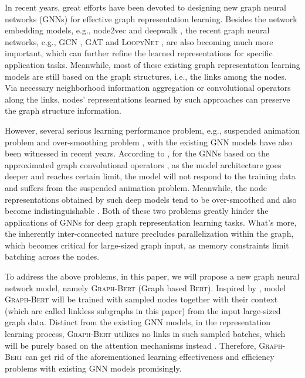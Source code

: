 \documentclass{article}
\newcommand{\our}{\textsc{Graph-Bert}}
\newcommand{\bert}{\textsc{Bert}}
\newcommand{\gcn}{\textsc{GCN}}
\newcommand{\gat}{\textsc{GAT}}
\newcommand{\loopy}{\textsc{LoopyNet}}
\begin{document}
In recent years, great efforts have been devoted to designing new graph neural networks (GNNs) for effective graph representation learning. Besides the network embedding models, e.g., node2vec \cite{DBLP:journals/corr/GroverL16} and deepwalk \cite{Perozzi:2014:DOL:2623330.2623732}, the recent graph neural networks, e.g., {\gcn} \cite{Kipf_Semi_CORR_16}, {\gat} \cite{Velickovic_Graph_ICLR_18} and {\loopy} \cite{loopynet}, are also becoming much more important, which can further refine the learned representations for specific application tasks. Meanwhile, most of these existing graph representation learning models are still based on the graph structures, i.e., the links among the nodes. Via necessary neighborhood information aggregation or convolutional operators along the links, nodes' representations learned by such approaches can preserve the graph structure information. 

However, several serious learning performance problem, e.g., suspended animation problem \cite{Zhang2019GResNetGR} and over-smoothing problem \cite{Li_Deeper_CORR_18}, with the existing GNN models have also been witnessed in recent years. According to \cite{Zhang2019GResNetGR}, for the GNNs based on the approximated graph convolutional operators \cite{Hammond_2011}, as the model architecture goes deeper and reaches certain limit, the model will not respond to the training data and suffers from the suspended animation problem. Meanwhile, the node representations obtained by such deep models tend to be over-smoothed and also become indistinguishable \cite{Li_Deeper_CORR_18}. Both of these two problems greatly hinder the applications of GNNs for deep graph representation learning tasks. What's more, the inherently inter-connected nature precludes parallelization within the graph, which becomes critical for large-sized graph input, as memory constraints limit batching across the nodes.

To address the above problems, in this paper, we will propose a new graph neural network model, namely {\our} (Graph based {\bert}). Inspired by \cite{ZCG18}, model {\our} will be trained with sampled nodes together with their context (which are called linkless subgraphs in this paper) from the input large-sized graph data. Distinct from the existing GNN models, in the representation learning process, {\our} utilizes no links in such sampled batches, which will be purely based on the attention mechanisms instead \cite{VSPUJGKP17,DCLT18}. Therefore, {\our} can get rid of the aforementioned learning effectiveness and efficiency problems with existing GNN models promisingly.
\end{document}
